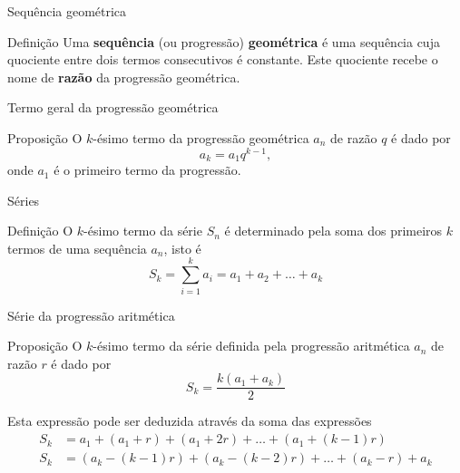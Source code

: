 \begin{frame}[fragile]{Sequência geométrica}

    \begin{block}{Definição}
        Uma \textbf{sequência} (ou progressão) \textbf{geométrica} é uma sequência cuja quociente entre dois termos consecutivos é constante. Este quociente recebe o nome de \textbf{razão} da progressão geométrica.
    \end{block}

\end{frame}

\begin{frame}[fragile]{Termo geral da progressão geométrica}

    \begin{block}{Proposição}
        O $k$-ésimo termo da progressão geométrica $a_n$ de razão $q$ é dado por
        $$
            a_k = a_1q^{k - 1},
        $$
        onde $a_1$ é o primeiro termo da progressão.
    \end{block}

\end{frame}

\begin{frame}[fragile]{Séries}

    \begin{block}{Definição}
        O $k$-ésimo termo da série $S_n$ é determinado pela soma dos primeiros $k$ termos de uma sequência $a_n$, isto é
        $$
            S_k = \sum_{i = 1}^k a_i = a_1 + a_2 + \ldots + a_k
        $$
    \end{block}

\end{frame}

\begin{frame}[fragile]{Série da progressão aritmética}

    \begin{block}{Proposição}
        O $k$-ésimo termo da série definida pela progressão aritmética $a_n$ de razão $r$ é dado por
        $$
            S_k = \frac{k(a_1 + a_k)}{2}
        $$
    \end{block}

    \vspace{0.2in}

Esta expressão pode ser deduzida através da soma das expressões
$$
\begin{array}{rl}
    S_k\! \! \! \! &= a_1 + (a_1 + r) + (a_1 + 2r) + \ldots + (a_1 + (k - 1)r) \\
    S_k\! \! \! \! &= (a_k - (k - 1)r) + (a_k - (k - 2)r) + \ldots + (a_k - r) + a_k
\end{array}
$$
\end{frame}

